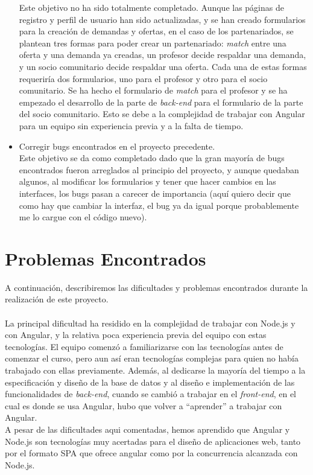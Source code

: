 \documentclass[11pt]{book}
\begin{document}
\begin{itemize}
	Este objetivo no ha sido totalmente completado. Aunque las páginas de registro y perfil de usuario han sido actualizadas, y se han creado formularios para la creación de demandas y ofertas, en el caso de los partenariados, se plantean tres formas para poder crear un partenariado: \emph{match} entre una oferta y una demanda ya creadas, un profesor decide respaldar una demanda, y un socio comunitario decide respaldar una oferta. Cada una de estas formas requeriría dos formularios, uno para el profesor y otro para el socio comunitario. Se ha hecho el formulario de \emph{match} para el profesor y se ha empezado el desarrollo de la parte de \emph{back-end} para el formulario de la parte del socio comunitario. Esto se debe a la complejidad de trabajar con Angular para un equipo sin experiencia previa y a la falta de tiempo.
	\item Corregir bugs encontrados en el proyecto precedente.\\
	Este objetivo se da como completado dado que la gran mayoría de bugs encontrados fueron arreglados al principio del proyecto, y aunque quedaban algunos, al modificar los formularios y tener que hacer cambios en las interfaces, los bugs pasan a carecer de importancia (aquí quiero decir que como hay que cambiar la interfaz, el bug ya da igual porque probablemente me lo cargue con el código nuevo).

\end{itemize}

\section{Problemas Encontrados}
A continuación, describiremos las dificultades y problemas encontrados durante la realización de este proyecto. \\\\
La principal dificultad ha residido en la complejidad de trabajar con Node.js y con Angular, y la relativa poca experiencia previa del equipo con estas tecnologías. El equipo comenzó a familiarizarse con las tecnologías antes de comenzar el curso, pero aun así eran tecnologías complejas para quien no había trabajado con ellas previamente. Además, al dedicarse la mayoría del tiempo a la especificación y diseño de la base de datos y al diseño e implementación de las funcionalidades de \emph{back-end}, cuando se cambió a trabajar en el \emph{front-end}, en el cual es donde se usa Angular, hubo que volver a ``aprender'' a trabajar con Angular.\\
A pesar de las dificultades aqui comentadas, hemos aprendido que Angular y Node.js son tecnologías muy acertadas para el diseño de aplicaciones web, tanto por el formato SPA que ofrece angular como por la concurrencia alcanzada con Node.js.
\end{document}
